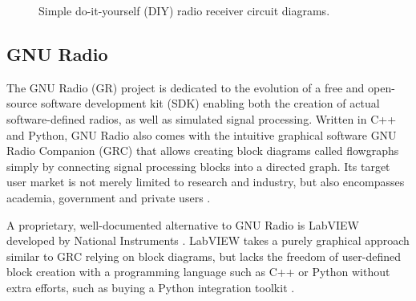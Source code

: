 \begin{figure}[tb]
	\label{fig:radio-receiver-circuits}
	\begin{center}
		\qquad
	\end{center}
	\caption{Simple do-it-yourself (DIY) radio receiver circuit diagrams.}
\end{figure}

\subsection{GNU Radio}
\label{sec:gnu-radio}

The GNU Radio (GR) project is dedicated to the evolution of a free and open-source software development kit (SDK) enabling both the creation of actual software-defined radios, as well as simulated signal processing. Written in C++ and Python, GNU Radio also comes with the intuitive graphical software GNU Radio Companion (GRC) that allows creating block diagrams called flowgraphs simply by connecting signal processing blocks into a directed graph. Its target user market is not merely limited to research and industry, but also encompasses academia, government and private users \cite{gnuradio-about}.

A proprietary, well-documented alternative to GNU Radio is LabVIEW developed by National Instruments \cite{labview-about}. LabVIEW takes a purely graphical approach similar to GRC relying on block diagrams, but lacks the freedom of user-defined block creation with a programming language such as C++ or Python without extra efforts, such as buying a Python integration toolkit \cite{labview-python}.

